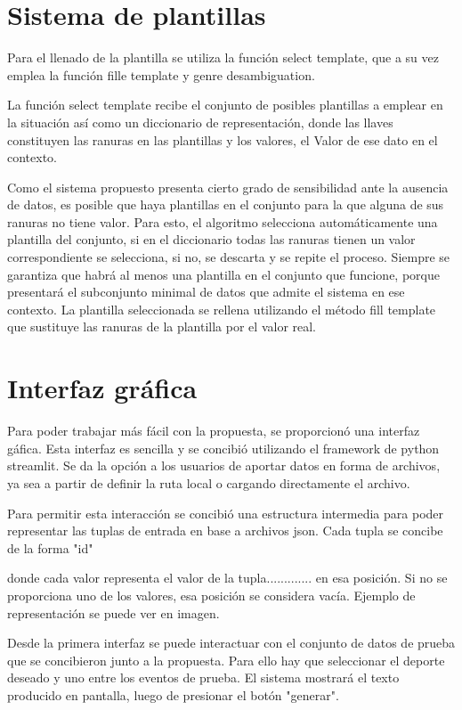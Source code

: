 \section{Sistema de plantillas}


Para el llenado de la plantilla se utiliza la función select template, que a su vez emplea la función
fille template  y genre desambiguation.

La función  select template recibe el conjunto de posibles plantillas a emplear en la situación así como un 
diccionario de representación, donde las llaves constituyen las ranuras en las plantillas y los valores, el Valor
de ese dato en el contexto.

Como el sistema propuesto presenta cierto grado de sensibilidad ante la ausencia de datos, es posible
que haya plantillas en el conjunto para la que alguna de sus ranuras no tiene valor. Para esto, el algoritmo
selecciona automáticamente una plantilla del conjunto, si en el diccionario todas las ranuras tienen un valor 
correspondiente se selecciona, si no, se descarta y se repite el proceso. Siempre se garantiza que habrá
al menos una plantilla en el conjunto que funcione, porque presentará el subconjunto minimal de datos que
admite el sistema en ese contexto. La plantilla seleccionada se rellena utilizando el  método fill template
que sustituye las ranuras de la plantilla por el valor real.






\section{Interfaz gráfica}



Para poder trabajar más fácil con la propuesta, se proporcionó una interfaz gáfica. Esta interfaz es sencilla
 y se concibió utilizando el framework de python streamlit. Se da la opción a los usuarios de aportar
 datos en forma de archivos, ya sea a partir de definir la ruta local o cargando directamente el archivo.

 Para permitir  esta interacción se concibió una estructura intermedia para poder representar las tuplas
 de entrada en base a archivos json.  Cada tupla se concibe de la forma "id"

 donde cada valor representa el valor de la tupla............. en esa posición. Si no se proporciona uno de los 
 valores, esa posición se considera vacía. Ejemplo de representación se puede ver en imagen.

 Desde la primera interfaz se puede interactuar con el conjunto de datos de prueba que se concibieron
junto a la propuesta. Para ello hay que seleccionar el deporte deseado y uno entre los eventos de prueba.
El sistema mostrará el texto producido en pantalla, luego de presionar el botón "generar".


 










